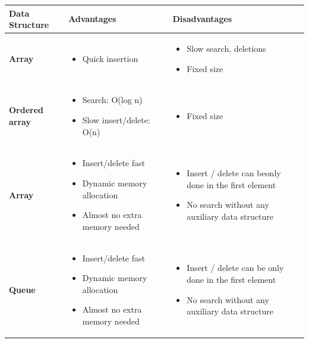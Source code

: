 \documentclass{article}
\begin{document}
\begin{table}[H]
	\small
	\centering
    \begin{tabulary}{1.0\textwidth}{L p{0.4\textwidth} p{0.4\textwidth}} 
        \textbf{Data  Structure} & \textbf{\hspace{1cm} Advantages} & \textbf{\hspace{1cm}Disadvantages} \\
        \hline
        \textbf{Array} & \begin{itemize} \item{Quick insertion} \end{itemize} & \begin{itemize} \item{Slow search, deletions} \item{Fixed size} \end{itemize}\\
        
        
        \textbf{Ordered array} & \begin{itemize} \item{Search: O(log n)} \item{Slow insert/delete: O(n)}  \end{itemize} & \begin{itemize} \item{Fixed size} \end{itemize}\\
        
        
        \textbf{Array} & \begin{itemize} \item{Insert/delete fast} \item{Dynamic memory allocation} \item{Almost no extra memory needed} \end{itemize} & \begin{itemize} \item{Insert / delete can be\newline only done in the first element} \item{No search without any auxiliary data structure} \end{itemize}\\
        
        
        \textbf{Queue} & \begin{itemize} \item{Insert/delete fast} \item{Dynamic memory allocation} \item{Almost no extra memory needed} \end{itemize} & \begin{itemize} \item{Insert / delete can be only done in the first element} \item{No search without any auxiliary data structure} \end{itemize}\\
        

\end{tabulary}
\end{table}
\end{document}
